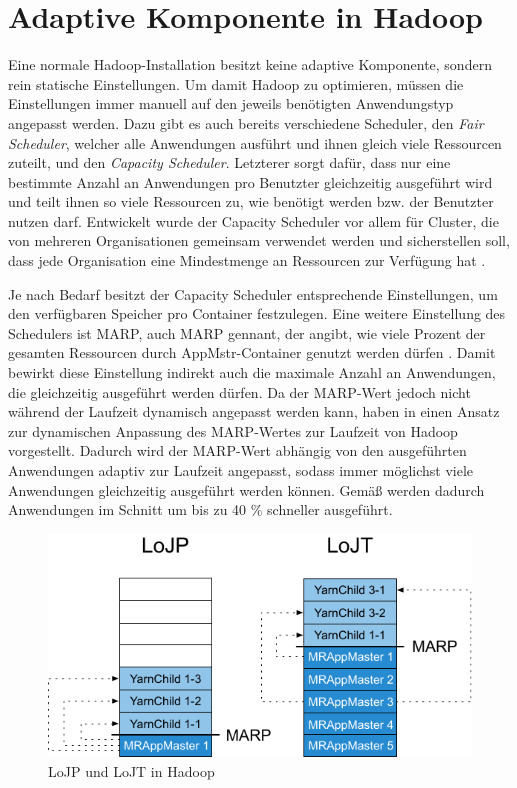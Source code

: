 \section{Adaptive Komponente in Hadoop}\label{sec:inriaSetting}

Eine normale Hadoop-Installation besitzt keine adaptive Komponente, sondern rein statische Einstellungen. Um damit Hadoop zu optimieren, müssen die Einstellungen immer manuell auf den jeweils benötigten Anwendungstyp angepasst werden. Dazu gibt es auch bereits verschiedene Scheduler, den \emph{Fair Scheduler}, welcher alle Anwendungen ausführt und ihnen gleich viele Ressourcen zuteilt, und den \emph{Capacity Scheduler}. Letzterer sorgt dafür, dass nur eine bestimmte Anzahl an Anwendungen pro Benutzter gleichzeitig ausgeführt wird und teilt ihnen so viele Ressourcen zu, wie benötigt werden bzw. der Benutzter nutzen darf. Entwickelt wurde der Capacity Scheduler vor allem für Cluster, die von mehreren Organisationen gemeinsam verwendet werden und sicherstellen soll, dass jede Organisation eine Mindestmenge an Ressourcen zur Verfügung hat \cite{HadoopCapScheduler271}.

Je nach Bedarf besitzt der Capacity Scheduler entsprechende Einstellungen, um \zB den verfügbaren Speicher pro Container festzulegen. Eine weitere Einstellung des Schedulers ist \acl{MARP}, auch \acs{MARP} gennant, der angibt, wie viele Prozent der gesamten Ressourcen durch \ac{AppMstr}-Container genutzt werden dürfen \cite{HadoopCapScheduler271}. Damit bewirkt diese Einstellung indirekt auch die maximale Anzahl an Anwendungen, die gleichzeitig ausgeführt werden dürfen. Da der \ac{MARP}-Wert jedoch nicht während der Laufzeit dynamisch angepasst werden kann, haben \citeauthor{zhang2016} in \cite{zhang2016} einen Ansatz zur dynamischen Anpassung des \ac{MARP}-Wertes zur Laufzeit von Hadoop vorgestellt. Dadurch wird der \ac{MARP}-Wert abhängig von den ausgeführten Anwendungen adaptiv zur Laufzeit angepasst, sodass immer möglichst viele Anwendungen gleichzeitig ausgeführt werden können. Gemäß \citeauthor{zhang2016} werden dadurch Anwendungen im Schnitt um bis zu 40 \% schneller ausgeführt.

\begin{figure}
    \centering
    \includegraphics[width=.8\columnwidth]{./images/marpValue.pdf}
    \caption[LoJP und LoJT in Hadoop]{LoJP und LoJT in Hadoop \cite{zhang2016}}
    \label{fig:marpValue}
\end{figure}

